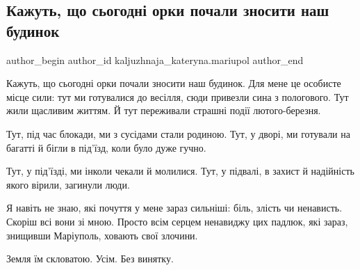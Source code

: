  
 
 
 
 

\subsection{Кажуть, що сьогодні орки почали зносити наш будинок}
\label{sec:24_04_2023.fb.kaljuzhnaja_kateryna.mariupol.1.kazhut_scho_orky_pochaly_sjogodni_znosyty_nash_budynok}

\ifcmt
 author_begin
   author_id kaljuzhnaja_kateryna.mariupol
 author_end
\fi

Кажуть, що сьогодні орки почали зносити наш будинок. Для мене це особисте місце
сили: тут ми готувалися до весілля, сюди привезли сина з пологового. Тут жили
щасливим життям. Й тут переживали страшні події лютого-березня.

Тут, під час блокади, ми з сусідами стали родиною. Тут, у дворі, ми готували на
багатті й бігли в під'їзд, коли було дуже гучно. 

Тут, у під'їзді, ми інколи чекали й молилися. Тут, у підвалі, в захист й
надійність якого вірили, загинули люди. 

Я навіть не знаю, які почуття у мене зараз сильніші: біль, злість чи ненависть.
Скоріш всі вони зі мною. Просто всім серцем ненавиджу цих падлюк, які зараз,
знищивши Маріуполь, ховають свої злочини. 

Земля їм скловатою. Усім. Без винятку.

